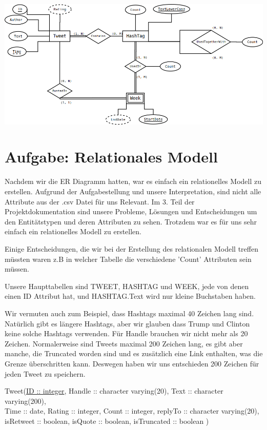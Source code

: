 \vspace{1cm}
\includegraphics[width=\textwidth]{../ER-Diagramms/ERDiagramm.png}

\section{Aufgabe: Relationales Modell}

Nachdem wir die ER Diagramm hatten, war es einfach ein relationelles Modell zu erstellen. Aufgrund der Aufgabestellung 
und unsere Interpretation, sind nicht alle Attribute aus der .csv Datei für uns Relevant. Im 3. Teil der Projektdokumentation
sind unsere Probleme, Lösungen und Entscheidungen um den Entitätstypen und deren Attributen zu sehen. Trotzdem war es 
für uns sehr einfach ein relationelles Modell zu erstellen.

Einige Entscheidungen, die wir bei der Erstellung des relationalen Modell treffen müssten waren z.B in welcher Tabelle die 
verschiedene 'Count' Attributen sein müssen.

Unsere Haupttabellen sind TWEET, HASHTAG und WEEK, jede von denen einen ID Attribut hat, und HASHTAG.Text wird nur kleine 
Buchstaben haben. 

Wir vermuten auch zum Beispiel, dass Hashtags maximal 40 Zeichen lang sind. Natürlich gibt es längere Hashtags, aber wir glauben 
dass Trump und Clinton keine solche Hashtags verwenden. Für Handle brauchen wir nicht mehr als 20 Zeichen. Normalerweise sind 
Tweets maximal 200 Zeichen lang, es gibt aber manche, die Truncated worden sind und es zusätzlich eine Link enthalten, was 
die Grenze überschritten kann. Deswegen haben wir uns entschieden 200 Zeichen für jeden Tweet zu speichern.

Tweet(\underline{ID :: integer}, Handle :: character varying(20), Text :: character varying(200), \\
	\hspace*{10mm} Time :: date, Rating :: integer, Count :: integer, replyTo :: character varying(20), \\
    \hspace*{10mm} isRetweet :: boolean, isQuote :: boolean, isTruncated :: boolean ) \\
    
